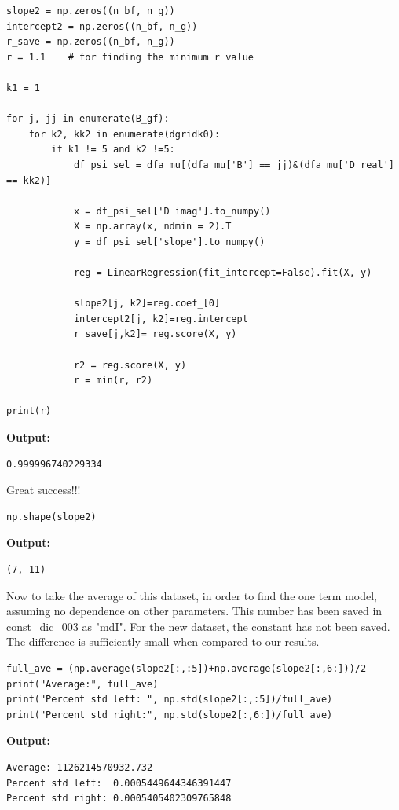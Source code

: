\documentclass{article}
\begin{document}
\begin{lstlisting}
slope2 = np.zeros((n_bf, n_g))
intercept2 = np.zeros((n_bf, n_g))
r_save = np.zeros((n_bf, n_g))
r = 1.1    # for finding the minimum r value

k1 = 1

for j, jj in enumerate(B_gf):
    for k2, kk2 in enumerate(dgridk0):
        if k1 != 5 and k2 !=5:
            df_psi_sel = dfa_mu[(dfa_mu['B'] == jj)&(dfa_mu['D real'] == kk2)]

            x = df_psi_sel['D imag'].to_numpy()
            X = np.array(x, ndmin = 2).T
            y = df_psi_sel['slope'].to_numpy()

            reg = LinearRegression(fit_intercept=False).fit(X, y)

            slope2[j, k2]=reg.coef_[0]
            intercept2[j, k2]=reg.intercept_
            r_save[j,k2]= reg.score(X, y)

            r2 = reg.score(X, y)
            r = min(r, r2)

print(r)\end{lstlisting}

\textbf{Output:}\begin{verbatim}
0.999996740229334

\end{verbatim}

Great success!!!

\begin{lstlisting}
np.shape(slope2)\end{lstlisting}

\textbf{Output:}\begin{verbatim}
(7, 11)
\end{verbatim}

Now to take the average of this dataset, in order to find the one term model, assuming no dependence on other parameters. This number has been saved  in const\_dic\_003 as "mdI". For the new dataset, the constant has not been saved. The difference is sufficiently small when compared to our results.

\begin{lstlisting}
full_ave = (np.average(slope2[:,:5])+np.average(slope2[:,6:]))/2
print("Average:", full_ave)
print("Percent std left: ", np.std(slope2[:,:5])/full_ave)
print("Percent std right:", np.std(slope2[:,6:])/full_ave)\end{lstlisting}

\textbf{Output:}\begin{verbatim}
Average: 1126214570932.732
Percent std left:  0.0005449644346391447
Percent std right: 0.0005405402309765848

\end{verbatim}
\end{document}
